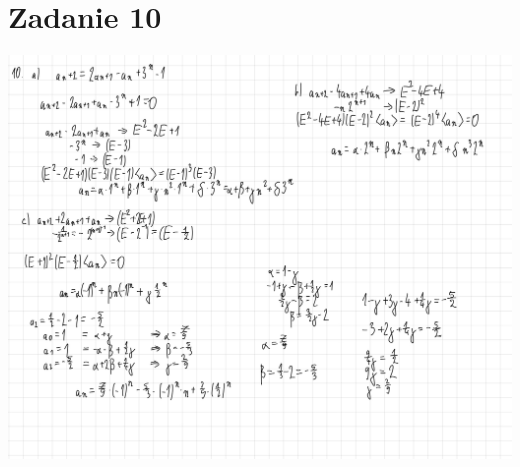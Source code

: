 \documentclass[12pt]{article}
\begin{document}
\section{Zadanie 10}
\includegraphics[width=180mm]{zad10}
\end{document}
